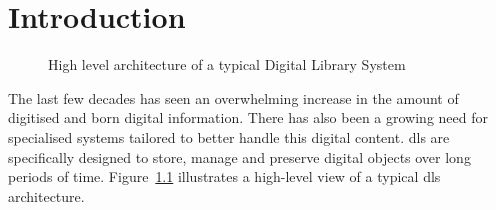 \chapter{Introduction\label{ch:intro}}


\begin{figure}
 \centering
 \framebox[\textwidth]{
 
 }
 \caption{High level architecture of a typical Digital Library System}
 \label{fig:introduction:overview:digital-library-system-architecture}
\end{figure}

The last few decades has seen an overwhelming increase in the amount of digitised and born digital information. There has also been a growing need for specialised systems tailored to better handle this digital content. \glspl{dl} are specifically designed to store, manage and preserve digital objects over long periods of time. Figure~\ref{fig:introduction:overview:digital-library-system-architecture} illustrates a high-level view of a typical \gls{dls} architecture.







